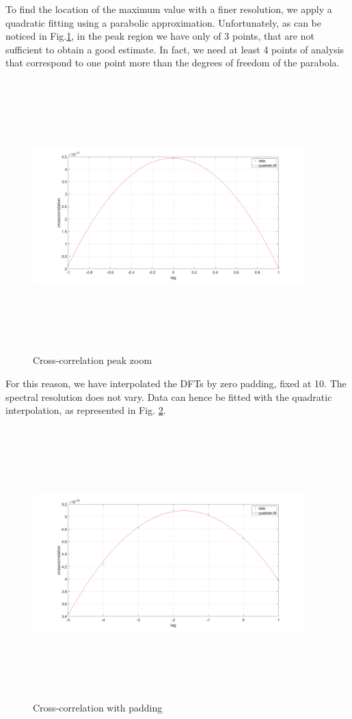 To find the location of the maximum value with a finer resolution, we apply a quadratic fitting using a parabolic approximation. Unfortunately, as can be noticed in Fig.\ref{fig:3points}, in the peak region we have only of 3 points, that are not sufficient to obtain a good estimate. In fact, we need at least 4 points of analysis that correspond to one point more than the degrees of freedom of the parabola.
\begin{figure}[H]
	\centering
	\includegraphics[height=10.5cm, width=10.5cm, keepaspectratio]{img/3points.png}
	\caption{Cross-correlation peak zoom}\label{fig:3points}
\end{figure}

For this reason, we have interpolated the DFTs by zero padding, fixed at 10. The spectral resolution does not vary. Data can hence be fitted with the quadratic interpolation, as represented in Fig. \ref{fig:10padding}.

\begin{figure}[H]
	\centering
	\includegraphics[height=10.5cm, width=10.5cm, keepaspectratio]{img/padding10.png}
	\caption{Cross-correlation with padding}\label{fig:10padding}
\end{figure}

